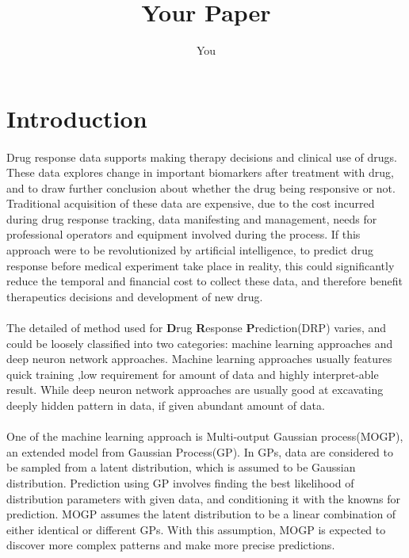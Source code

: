 \documentclass{article}
\title{Your Paper}
\author{You}
\begin{document}
\maketitle

\section{Introduction}
\paragraph{}
Drug response data supports making therapy decisions and clinical use of drugs. These data explores change in important biomarkers after treatment with drug, and to draw further conclusion about whether the drug being responsive or not. Traditional acquisition of these data are expensive, due to the cost incurred during drug response tracking, data manifesting and management, needs for professional operators and equipment involved during the process. If this approach were to be revolutionized by artificial intelligence, to predict drug response before medical experiment take place in reality, this could significantly reduce the temporal and financial cost to collect these data, and therefore benefit therapeutics decisions and development of new drug.
\paragraph{}
The detailed of method used for \textbf{D}rug \textbf{R}esponse \textbf{P}rediction(DRP) varies, and could be loosely classified into two categories: machine learning approaches and deep neuron network approaches. Machine learning approaches usually features quick training ,low requirement for amount of data and highly interpret-able result. While deep neuron network approaches are usually good at excavating deeply hidden pattern in data, if given abundant amount of data.
\paragraph{}
One of the machine learning approach is Multi-output Gaussian process(MOGP), an extended model from Gaussian Process(GP). In GPs, data are considered to be sampled from a latent distribution, which is assumed to be Gaussian distribution. Prediction using GP involves finding the best likelihood of distribution parameters with given data, and conditioning it with the knowns for prediction. MOGP assumes the latent distribution to be a linear combination of either identical or different GPs. With this assumption, MOGP is expected to discover more complex patterns and make more precise predictions.
\end{document}
